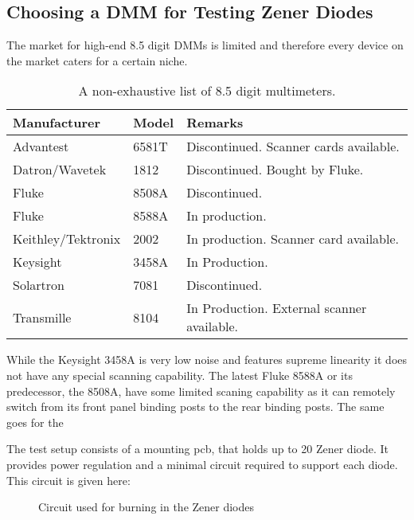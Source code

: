 \subsection{Choosing a DMM for Testing Zener Diodes}
The market for high-end \num{8.5} digit DMMs is limited and therefore every device on the market caters for a certain niche.

\begin{table}[h]
    \centering
    \begin{tabular}{ |l|l|l| }
        \hline
        Manufacturer & Model & Remarks \\
        \hline
        Advantest & 6581T & Discontinued. Scanner cards available. \\
        Datron/Wavetek & 1812 & Discontinued. Bought by Fluke. \\
        Fluke & 8508A & Discontinued. \\
        Fluke & 8588A & In production. \\
        Keithley/Tektronix & 2002 & In production. Scanner card available. \\
        Keysight & 3458A & In Production. \\
        Solartron & 7081 & Discontinued. \\
        Transmille & 8104 & In Production. External scanner available. \\
        \hline
    \end{tabular}
    \caption{A non-exhaustive list of \num{8.5} digit multimeters.}
    \label{tab:list_of_dmms}
\end{table}


While the Keysight 3458A is very low noise and features supreme linearity it does not have any special scanning capability. The latest Fluke 8588A or its predecessor, the 8508A, have some limited scaning capability as it can remotely switch from its front panel binding posts to the rear binding posts. The same goes for the



The test setup consists of a mounting pcb, that holds up to 20 Zener diode. It provides power regulation and a minimal circuit required to support each diode. This circuit is given here:

\begin{figure}[h]
    \centering
    \caption{Circuit used for burning in the Zener diodes}
\end{figure}

